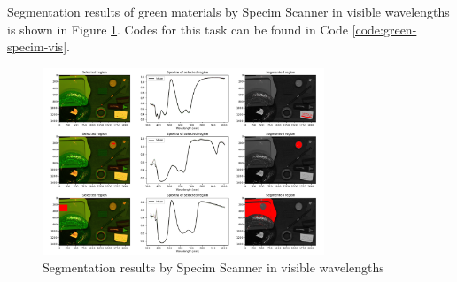 Segmentation results of green materials by Specim Scanner in visible
wavelengths is shown in Figure \ref{fig:green-specim-vis}.
Codes for this task can be found in Code \ref{code:green-specim-vis}.
\begin{figure}[H]
  \centering
  \caption{Segmentation results by Specim Scanner in visible wavelengths}
  \label{fig:green-specim-vis}
  \includegraphics[width=0.75\textwidth]{./fig/task1/specim-scanner-vis.png}
\end{figure}
